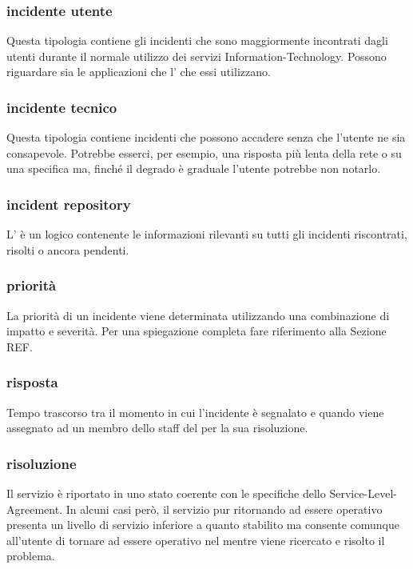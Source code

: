 \subsubsection{incidente utente}
Questa tipologia contiene gli incidenti che sono maggiormente incontrati dagli utenti durante il normale utilizzo dei servizi \acs{Information-Technology}. Possono riguardare sia le applicazioni che l' che essi utilizzano.

\subsubsection{incidente tecnico}
Questa tipologia contiene incidenti che possono accadere senza che l'utente ne sia consapevole. Potrebbe esserci, per esempio, una risposta più lenta della rete o su una specifica  ma, finché il degrado è graduale l'utente potrebbe non notarlo.

\subsubsection{incident repository}
L' è un  logico contenente le informazioni rilevanti su tutti gli incidenti riscontrati, risolti o ancora pendenti.

\subsubsection{priorità}
La priorità di un incidente viene determinata utilizzando una combinazione di impatto e severità. Per una spiegazione completa fare riferimento alla Sezione REF.

\subsubsection{risposta}
Tempo trascorso tra il momento in cui l'incidente è segnalato e quando viene assegnato ad un membro dello staff del  per la sua risoluzione.

\subsubsection{risoluzione}
Il servizio è riportato in uno stato coerente con le specifiche dello \ac{Service-Level-Agreement}. In alcuni casi però, il servizio pur ritornando ad essere operativo presenta un livello di servizio inferiore a quanto stabilito ma consente comunque all'utente di tornare ad essere operativo nel mentre viene ricercato e risolto il problema.

